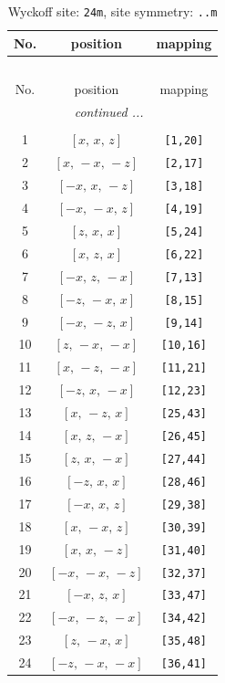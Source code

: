 \documentclass[fleqn,8pt]{jsarticle}
\begin{document}
\renewcommand{\arraystretch}{1.2}
\begin{longtable}{ccc}
\caption{Wyckoff site: {\tt 24m}, site symmetry: {\tt ..m}}
 \\
 \hline \hline
No. & position & mapping \\ \hline \endfirsthead

\multicolumn{2}{l}{\tablename\ \thetable{}} \\
 \hline \hline
No. & position & mapping \\ \hline \endhead

 \hline \hline
\multicolumn{2}{r}{\footnotesize\it continued ...} \\ \endfoot

 \hline \hline
\multicolumn{2}{r}{} \\ \endlastfoot

1 & $\left[ x,\, x,\, z \right]$ & {\tt [1,20]} \\ \hline
2 & $\left[ x,\, - x,\, - z \right]$ & {\tt [2,17]} \\ \hline
3 & $\left[ - x,\, x,\, - z \right]$ & {\tt [3,18]} \\ \hline
4 & $\left[ - x,\, - x,\, z \right]$ & {\tt [4,19]} \\ \hline
5 & $\left[ z,\, x,\, x \right]$ & {\tt [5,24]} \\ \hline
6 & $\left[ x,\, z,\, x \right]$ & {\tt [6,22]} \\ \hline
7 & $\left[ - x,\, z,\, - x \right]$ & {\tt [7,13]} \\ \hline
8 & $\left[ - z,\, - x,\, x \right]$ & {\tt [8,15]} \\ \hline
9 & $\left[ - x,\, - z,\, x \right]$ & {\tt [9,14]} \\ \hline
10 & $\left[ z,\, - x,\, - x \right]$ & {\tt [10,16]} \\ \hline
11 & $\left[ x,\, - z,\, - x \right]$ & {\tt [11,21]} \\ \hline
12 & $\left[ - z,\, x,\, - x \right]$ & {\tt [12,23]} \\ \hline
13 & $\left[ x,\, - z,\, x \right]$ & {\tt [25,43]} \\ \hline
14 & $\left[ x,\, z,\, - x \right]$ & {\tt [26,45]} \\ \hline
15 & $\left[ z,\, x,\, - x \right]$ & {\tt [27,44]} \\ \hline
16 & $\left[ - z,\, x,\, x \right]$ & {\tt [28,46]} \\ \hline
17 & $\left[ - x,\, x,\, z \right]$ & {\tt [29,38]} \\ \hline
18 & $\left[ x,\, - x,\, z \right]$ & {\tt [30,39]} \\ \hline
19 & $\left[ x,\, x,\, - z \right]$ & {\tt [31,40]} \\ \hline
20 & $\left[ - x,\, - x,\, - z \right]$ & {\tt [32,37]} \\ \hline
21 & $\left[ - x,\, z,\, x \right]$ & {\tt [33,47]} \\ \hline
22 & $\left[ - x,\, - z,\, - x \right]$ & {\tt [34,42]} \\ \hline
23 & $\left[ z,\, - x,\, x \right]$ & {\tt [35,48]} \\ \hline
24 & $\left[ - z,\, - x,\, - x \right]$ & {\tt [36,41]} \\
\end{longtable}
\end{document}
